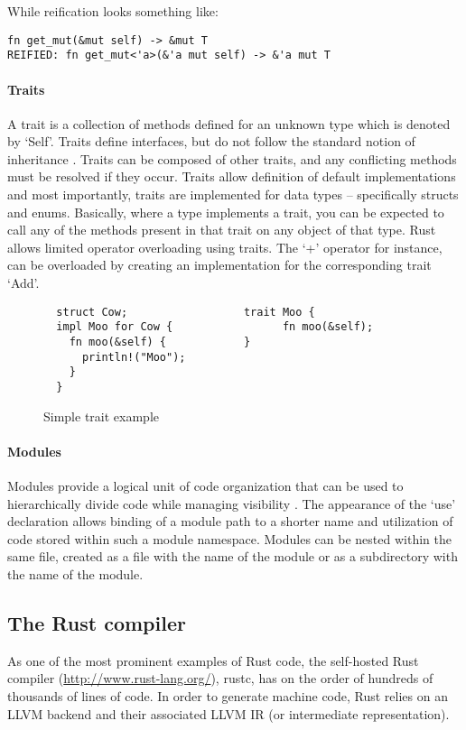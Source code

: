 While reification looks something like:
\begin{verbatim}
fn get_mut(&mut self) -> &mut T
REIFIED: fn get_mut<'a>(&'a mut self) -> &'a mut T
\end{verbatim}

\paragraph{Traits}
A trait is a collection of methods defined for an unknown type which is denoted by `Self'. Traits define interfaces, but do not follow the standard notion of inheritance \cite{traitexample15}. Traits can be composed of other traits, and any conflicting methods must be resolved if they occur. Traits allow definition of default implementations and most importantly, traits are implemented for data types -- specifically structs and enums. Basically, where a type implements a trait, you can be expected to call any of the methods present in that trait on any object of that type. Rust allows limited operator overloading using traits. The `+' operator for instance, can be overloaded by creating an implementation for the corresponding trait `Add'.

\begin{figure}[h]
\centering
\begin{verbatim}
  struct Cow;                  trait Moo {
  impl Moo for Cow {                 fn moo(&self);    
    fn moo(&self) {            }
      println!("Moo");                     
    }
  }
\end{verbatim}
\caption{Simple trait example}
\end{figure}

\paragraph{Modules}
Modules provide a logical unit of code organization that can be used to hierarchically divide code while managing visibility \cite{docmod15}. The appearance of the `use' declaration allows binding of a module path to a shorter name and utilization of code stored within such a module namespace. Modules can be nested within the same file, created as a file with the name of the module or as a subdirectory with the name of the module.


\subsection{The Rust compiler}
As one of the most prominent examples of Rust code, the self-hosted Rust compiler (\url{http://www.rust-lang.org/}), rustc, has on the order of hundreds of thousands of lines of code. In order to generate machine code, Rust relies on an LLVM backend and their associated LLVM IR (or intermediate representation).

